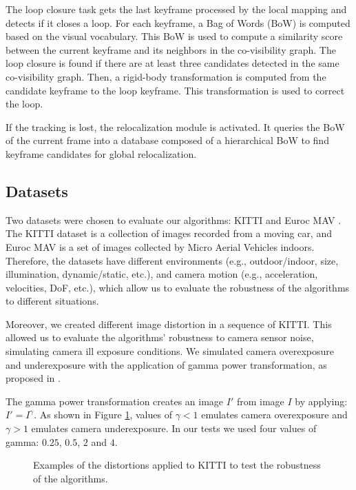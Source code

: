 \documentclass[a4paper, 10pt, conference]{ieeeconf}      %
\begin{document}
The loop closure task gets the last keyframe processed by the local mapping and detects if it closes a loop. For each keyframe, a Bag of Words (BoW) is computed based on the visual vocabulary. This BoW is used to compute a similarity score between the current keyframe and its neighbors in the co-visibility graph. The loop closure is found if there are at least three candidates detected in the same co-visibility graph. Then, a rigid-body transformation is computed from the candidate keyframe to the loop keyframe. This transformation is used to correct the loop.

If the tracking is lost, the relocalization module is activated. It queries the BoW of the current frame into a database composed of a hierarchical BoW to find keyframe candidates for global relocalization.


\subsection{Datasets}
\label{sec:datasets}
Two datasets were chosen to evaluate our algorithms: KITTI \cite{kitti-dataset} and Euroc MAV \cite{euroc-mav}. The KITTI dataset is a collection of images recorded from a moving car, and Euroc MAV is a set of images collected by Micro Aerial Vehicles indoors. Therefore, the datasets have different environments (e.g., outdoor/indoor, size, illumination, dynamic/static, etc.), and camera motion (e.g., acceleration, velocities, DoF, etc.), which allow us to evaluate the robustness of the algorithms to different situations.

Moreover, we created different image distortion in a sequence of KITTI. This allowed us to evaluate the algorithms' robustness to camera sensor noise, simulating camera ill exposure conditions.
We simulated camera overexposure and underexposure with the application of gamma power transformation, as proposed in \cite{emulate-exposure}. 

The gamma power transformation creates an image $I'$ from image $I$ by applying: $I' =I^{\gamma}$. As shown in Figure \ref{fig:distortions}, values of $\gamma < 1$ emulates camera overexposure and $\gamma > 1$ emulates camera underexposure. In our tests we used four values of gamma: $0.25$, $0.5$, $2$ and $4$. 

\begin{figure}[tb]
\centering
{}
\qquad
{}
\caption{Examples of the distortions applied to KITTI to test the robustness of the algorithms.}
\label{fig:distortions}
\end{figure}
\end{document}
